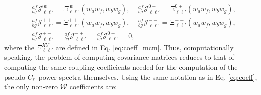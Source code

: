 \documentclass[a4paper,11pt]{article}
\newcommand{\PCL}{pseudo-$C_\ell$~}
\begin{document}
      \begin{align}
        &\,^{af}_{bg}\mathcal{J}^{00}_{\ell\ell'}=\Xi^{00}_{\ell\ell'}(w_aw_f,w_bw_g),\hspace{12pt}
         \,^{af}_{bg}\mathcal{J}^{0+}_{\ell\ell'}=\Xi^{0+}_{\ell\ell'}(w_aw_f,w_bw_g),\\
        &\,^{af}_{bg}\mathcal{J}^{++}_{\ell\ell'}=\Xi^{++}_{\ell\ell'}(w_aw_f,w_bw_g),\hspace{12pt}
         \,^{af}_{bg}\mathcal{J}^{--}_{\ell\ell'}=\Xi^{--}_{\ell\ell'}(w_aw_f,w_bw_g),\\
        &\,^{af}_{bg}\mathcal{J}^{+-}_{\ell\ell'}=
         \,^{af}_{bg}\mathcal{J}^{-+}_{\ell\ell'}=
         \,^{af}_{bg}\mathcal{J}^{0-}_{\ell\ell'}=0,
      \end{align}
      where the $\Xi^{XY}_{\ell\ell'}$ are defined in Eq. \ref{eq:coeff_mcm}.
      Thus, computationally speaking, the problem of computing covariance matrices reduces to that of computing the same coupling coefficients needed for the computation of the \PCL power spectra themselves. Using the same notation as in Eq. \ref{eq:coeff}, the only non-zero $\mathcal{W}$ coefficients are:
\end{document}
